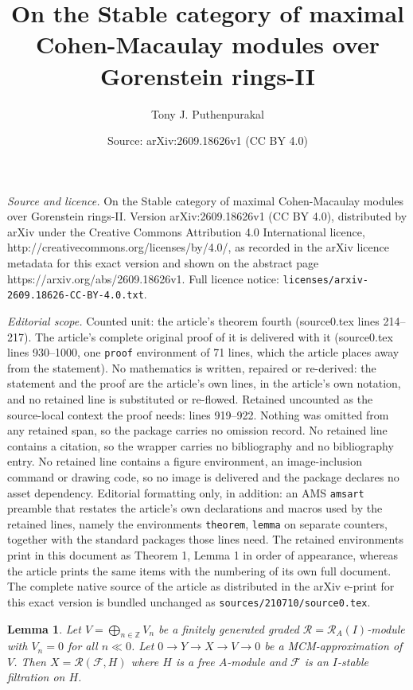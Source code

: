 \documentclass[10pt,a4paper]{amsart}
\title{On the Stable category of maximal Cohen-Macaulay modules over Gorenstein rings-II}
\author{Tony J. Puthenpurakal}
\date{Source: arXiv:2609.18626v1 (CC BY 4.0)}
\newtheorem{lemma}{Lemma}
\newcommand{\Fc}{\mathcal{F} }
\newcommand{\Z}{\mathbb{Z} }
\newcommand{\eR}{\mathcal{R} }
\newcommand{\rt}{\rightarrow}
\begin{document}
\maketitle

\noindent\emph{Source and licence.} On the Stable category of maximal Cohen-Macaulay modules over Gorenstein rings-II. Version arXiv:2609.18626v1 (CC BY 4.0), distributed by arXiv under the Creative Commons Attribution 4.0 International licence, http://creativecommons.org/licenses/by/4.0/, as recorded in the arXiv licence metadata for this exact version and shown on the abstract page https://arxiv.org/abs/2609.18626v1. Full licence notice: \texttt{licenses/arxiv-2609.18626-CC-BY-4.0.txt}.\par\smallskip

\noindent\textit{Editorial scope.} Counted unit: the article's theorem fourth (source0.tex lines 214--217). The article's complete original proof of it is delivered with it (source0.tex lines 930--1000, one \texttt{proof} environment of 71 lines, which the article places away from the statement). No mathematics is written, repaired or re-derived: the statement and the proof are the article's own lines, in the article's own notation, and no retained line is substituted or re-flowed.  Retained uncounted as the source-local context the proof needs: lines 919--922.  Nothing was omitted from any retained span, so the package carries no omission record.  No retained line contains a citation, so the wrapper carries no bibliography and no bibliography entry.  No retained line contains a figure environment, an image-inclusion command or drawing code, so no image is delivered and the package declares no asset dependency.  Editorial formatting only, in addition: an AMS \texttt{amsart} preamble that restates the article's own declarations and macros used by the retained lines, namely the environments \texttt{theorem}, \texttt{lemma} on separate counters, together with the standard packages those lines need.  The retained environments print in this document as Theorem 1, Lemma 1 in order of appearance, whereas the article prints the same items with the numbering of its own full document.  The complete native source of the article as distributed in the arXiv e-print for this exact version is bundled unchanged as \texttt{sources/210710/source0.tex}.
\begin{lemma}\label{clinton}
Let $V = \bigoplus_{n \in \Z}V_n$ be a finitely generated graded $\eR = \eR_A(I)$-module with $V_n = 0$ for all $n \ll 0$.
Let $0 \rt Y \rt X \rt V \rt 0$ be a MCM-approximation of $V$. Then $X = \eR(\Fc, H)$ where $H$ is a free $A$-module and $\Fc$ is an $I$-stable filtration on $H$.
\end{lemma}
\end{document}
